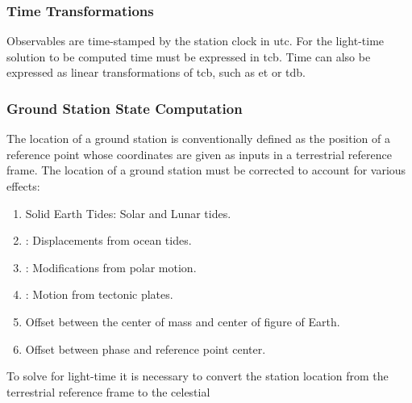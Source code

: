 \documentclass{article}
\begin{document}
                \subsubsection{\footnotesize{Time Transformations}}
                    Observables are time-stamped by the station clock
                    in \gls{utc}. For the light-time solution to be
                    computed time must be expressed in \gls{tcb}.
                    Time can also be expressed as linear
                    transformations of \gls{tcb},
                    such as \gls{et} or \gls{tdb}.
                \subsubsection{%
                    \footnotesize{Ground Station State Computation}
                }
                    The location of a ground station is
                    conventionally defined as the position
                    of a reference point whose coordinates are
                    given as inputs in a terrestrial reference
                    frame. The location of a ground station must
                    be corrected to account for various effects:
                    \begin{enumerate}
                        \item {}
                                      {Solid Earth Tides}:
                              Solar and Lunar tides.
                        \item {}:
                              Displacements from ocean tides.
                        \item {}:
                              Modifications from polar motion.
                        \item {}:
                              Motion from tectonic plates.
                        \item Offset between the center of mass
                              and center of figure of Earth.
                        \item Offset between phase and
                              reference point center.
                    \end{enumerate}
                    To solve for light-time it is necessary to
                    convert the station location from the
                    terrestrial reference frame to the celestial
\end{document}
